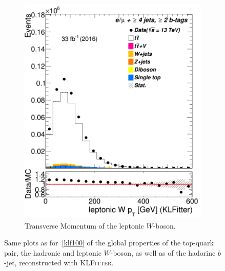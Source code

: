 \begin{figure}
\begin{subfigure}{0.25\textwidth}
		\includegraphics[width=\linewidth]{ControlPlots_emujets_2016_4incl_2incl/klf_Wlep_pt_emujets_2016.png}
		\caption{Transverse Momentum of the leptonic $W$-boson.} \label{fig:K27}
	\end{subfigure}	
		
		
		
		
		
		
		
	

	
		
		
		
	\caption{ Same plots as for~\cref{klf100} of the  global properties of the top-quark pair, the hadronic and leptonic $W$-boson, as well as of the hadorinc $b$-jet, reconstructed with \textsc{KLFitter}.}
\end{figure}	




